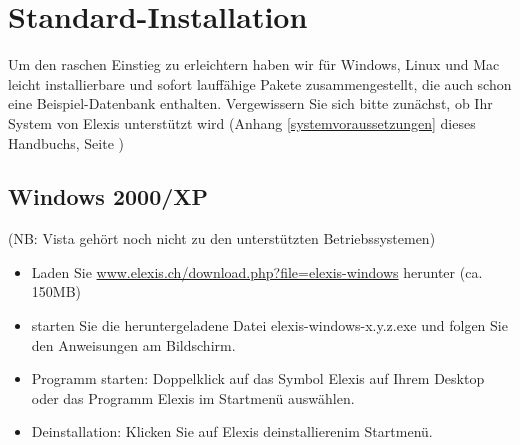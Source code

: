 
\section{Standard-Installation}
\label{easyistall}
Um den raschen Einstieg zu erleichtern haben wir für Windows, Linux und Mac leicht installierbare und sofort lauffähige Pakete zusammengestellt, die auch schon eine Beispiel-Datenbank enthalten.
Vergewissern Sie sich bitte zunächst, ob Ihr System von Elexis unterstützt wird (Anhang \ref{systemvoraussetzungen} dieses Handbuchs, Seite \pageref{systemvoraussetzungen})
\subsection{Windows 2000/XP}
(NB: Vista gehört noch nicht zu den unterstützten Betriebssystemen)
\begin{itemize}
	\item Laden Sie \href{http://www.elexis.ch/download.php?file=elexis-windows}{www.elexis.ch/down\-load.php?file=elexis-windows} herunter (ca. 150MB)
	\item starten Sie die heruntergeladene Datei elexis-windows-x.y.z.exe und folgen Sie den Anweisungen am Bildschirm.
    \item Programm starten: Doppelklick auf das Symbol \glqq Elexis\grqq{} auf Ihrem Desktop oder das Programm \glqq Elexis\grqq{} im Startmenü auswählen.
	\item Deinstallation: Klicken Sie auf \glqq Elexis deinstallieren\grqq im  Startmenü.
\end{itemize}

